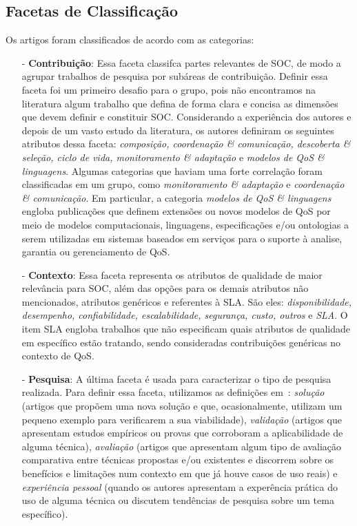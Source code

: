 \subsection{Facetas de Classificação}

Os artigos foram classificados de acordo com as categorias:
\begin{itemize}
\item[-] \textbf{Contribuição}: Essa faceta classifca partes relevantes de SOC, de modo a agrupar trabalhos de pesquisa por subáreas de contribuição. Definir essa faceta foi um primeiro desafio para o grupo, pois n\~{a}o encontramos na literatura algum trabalho que defina de forma clara e concisa as dimensões que devem definir e constituir SOC. Considerando a experi\^{e}ncia dos autores e depois de um vasto estudo da literatura, os autores definiram os seguintes atributos dessa faceta: \emph{composição, coordenação \& comunicação, descoberta \& seleção, ciclo de vida, monitoramento \& adaptação} e  \emph{modelos de QoS \& linguagens}. Algumas categorias que haviam uma forte correla\c{c}\~{a}o foram classificadas em um grupo, como  \emph{monitoramento \& adaptação} e \emph{coordenação \& comunicação}. Em particular, a categoria \emph{modelos de QoS \& linguagens} engloba publicações que definem extensões ou novos modelos de QoS por meio de modelos computacionais, linguagens, especificações e/ou ontologias a 
serem utilizadas em sistemas baseados em serviços para o suporte à analise, garantia ou gerenciamento de QoS.

\item[-] \textbf{Contexto}: Essa faceta representa os atributos de qualidade de maior relevância para SOC, além das opções para os demais atributos não mencionados, atributos genéricos e referentes à SLA. São eles: \emph{disponibilidade, desempenho, confiabilidade, escalabilidade, segurança, custo, outros} e \emph{SLA}. O item SLA engloba trabalhos que não especificam quais atributos de qualidade em específico estão tratando, sendo consideradas contribuições genéricas no contexto de QoS. 

\item[-] \textbf{Pesquisa}: A última faceta \'{e} usada para caracterizar o tipo de pesquisa realizada. Para definir essa faceta, utilizamos as defini\c{c}\~{o}es em~\cite{Wieringa:10.1007/s00766-005-0021-6}: 
\emph{solu\c c\~{a}o} (artigos que propõem uma nova solução e que, ocasionalmente, utilizam um pequeno exemplo para verificarem a sua viabilidade), \emph{validação} (artigos que apresentam 
estudos empíricos ou provas que corroboram a aplicabilidade de alguma t\'{e}cnica), \emph{avalia\c c\~{a}o} (artigos que apresentam 
algum tipo de avalia\c c\~{a}o comparativa entre t\'{e}cnicas propostas e/ou existentes e discorrem sobre os benefícios e limitações num contexto em que já houve casos de uso reais) e \emph{experiência pessoal} (quando os autores apresentam a exper\^{e}ncia pr\'{a}tica do uso de alguma t\'{e}cnica ou discutem tend\^{e}ncias de pesquisa sobre um tema espec\'{i}fico).
\end{itemize}

